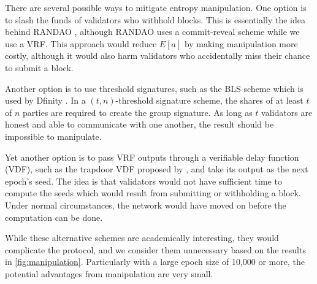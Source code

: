 There are several possible ways to mitigate entropy manipulation. One option is to slash the funds of validators who withhold blocks. This is essentially the idea behind RANDAO \cite{randao}, although RANDAO uses a commit-reveal scheme while we use a VRF. This approach would reduce $E[a]$ by making manipulation more costly, although it would also harm validators who accidentally miss their chance to submit a block.

Another option is to use threshold signatures, such as the BLS scheme which is used by Dfinity \cite{hanke2018dfinity}. In a $(t,n)$-threshold signature scheme, the shares of at least $t$ of $n$ parties are required to create the group signature. As long as $t$ validators are honest and able to communicate with one another, the result should be impossible to manipulate.

Yet another option is to pass VRF outputs through a verifiable delay function (VDF), such as the trapdoor VDF proposed by \cite{wesolowski2018efficient}, and take its output as the next epoch's seed. The idea is that validators would not have sufficient time to compute the seeds which would result from submitting or withholding a block. Under normal circumstances, the network would have moved on before the computation can be done.

While these alternative schemes are academically interesting, they would complicate the protocol, and we consider them unnecessary based on the results in \autoref{fig:manipulation}. Particularly with a large epoch size of 10,000 or more, the potential advantages from manipulation are very small.
